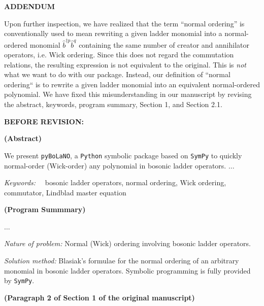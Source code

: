 \documentclass[12pt, a4paper]{article}
\newcommand{\bop}{\hat{b}}
\newcommand{\bdagn}[1]{\bop^{\dagger {#1}}}
\newcommand{\addendum}{
\newpage
\phantomsection
\vspace*{\fill}
\begin{center}
\Large{\uppercase{\textbf{Addendum}}}
\end{center}
\vspace*{\fill}
\newpage
}
\newenvironment{revpre}{%
\textbf{{BEFORE REVISION:}}
\par
}
{\bigskip}
\begin{document}

\addendum

Upon further inspection, we have realized that the term ``normal ordering'' is conventionally used to mean rewriting a given ladder monomial into a normal-ordered monomial $\bdagn{p}\bop^q$ containing the same number of creator and annihilator operators, i.e. Wick ordering. Since this does not regard the commutation relations, the resulting expression is not equivalent to the original. This is \emph{not} what we want to do with our package. Instead, our definition of ``normal ordering`` is to rewrite a given ladder monomial into an equivalent normal-ordered polynomial. We have fixed this misunderstanding in our manuscript by revising the abstract, keywords, program summary, Section 1, and Section 2.1. 

\begin{revpre}

\textbf{(Abstract)}

We present \texttt{pyBoLaNO}, a \texttt{Python} symbolic package based on \texttt{SymPy} to quickly normal-order (Wick-order) any polynomial in bosonic ladder operators. $\dots$

\textit{Keywords:}$\quad$ bosonic ladder operators, normal ordering, Wick ordering, commutator, Lindblad master equation


\textbf{(Program Summmary)}

$\dots$

{\em Nature of problem:} Normal (Wick) ordering involving bosonic ladder operators. 

{\em Solution method:} Blasiak's formulae for the normal ordering of an arbitrary monomial in bosonic ladder operators. Symbolic programming is fully provided by \texttt{SymPy}.

\textbf{(Paragraph 2 of Section 1 of the original manuscript)}


\end{revpre}
\end{document}

